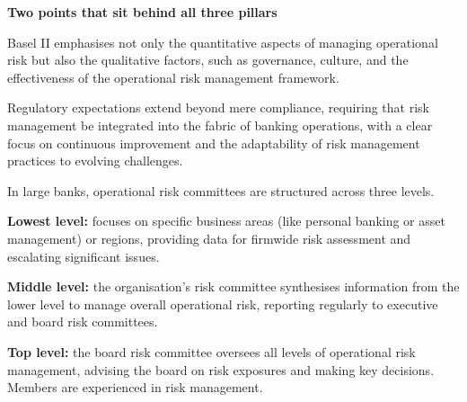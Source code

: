 \begin{center}
\end{center}

\begin{orkeybox}
{\sffamily\bfseries\fontsize{8.6}{10}\selectfont\color{navy}Two points that sit
behind all three pillars}\par
\vspace{4pt}
\begin{lettered}
\item Basel II emphasises not only the quantitative aspects of managing
operational risk but also the qualitative factors, such as governance, culture,
and the effectiveness of the operational risk management framework.
\item Regulatory expectations extend beyond mere compliance, requiring that risk
management be integrated into the fabric of banking operations, with a clear
focus on continuous improvement and the adaptability of risk management
practices to evolving challenges.
\end{lettered}
\end{orkeybox}



In large banks, operational risk committees are structured across three levels.

\begin{lettered}
\item \textbf{Lowest level:} focuses on specific business areas (like personal
banking or asset management) or regions, providing data for firmwide risk
assessment and escalating significant issues.
\item \textbf{Middle level:} the organisation's risk committee synthesises
information from the lower level to manage overall operational risk, reporting
regularly to executive and board risk committees.
\item \textbf{Top level:} the board risk committee oversees all levels of
operational risk management, advising the board on risk exposures and making key
decisions. Members are experienced in risk management.
\end{lettered}

